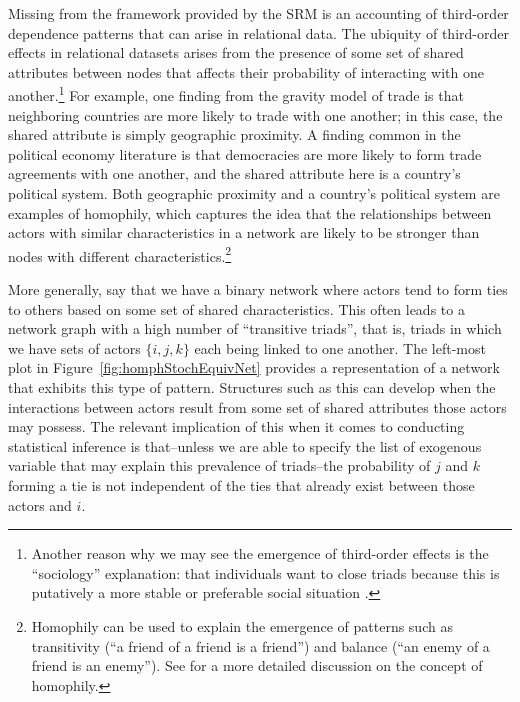\documentclass[12pt,onesided,pdflatex]{amsart}
\begin{document}
Missing from the framework provided by the SRM is an accounting of third-order dependence patterns that can arise in relational data. The ubiquity of third-order effects in relational datasets arises from the presence of some set of shared attributes between nodes that affects their probability of interacting with one another.\footnote{Another reason why we may see the emergence of third-order effects is the ``sociology'' explanation: that individuals want to close triads because  this is putatively a more stable or preferable social situation \citep{wasserman:faust:1994}.} For example, one finding from the gravity model of trade is that neighboring countries are more likely to trade with one another; in this case, the shared attribute is simply geographic proximity. A finding common in the political economy literature is that democracies are more likely to form trade agreements with one another, and the shared attribute here is a country's political system. Both geographic proximity and a country's political system are examples of homophily, which captures the idea that the relationships between actors with similar characteristics in a network are likely to be stronger than nodes with different characteristics.\footnote{Homophily can be used to explain the emergence of patterns such as transitivity (``a friend of a friend is a friend'') and balance (``an enemy of a friend is an enemy''). See \citet{shalizi:thomas:2011} for a more detailed discussion on the concept of homophily.} 

More generally, say that we have a binary network where actors tend to form ties to others based on some set of shared characteristics. This often leads to a network graph with a high number of ``transitive triads'', that is, triads in which we have sets of actors $\{i,j,k\}$ each being linked to one another. The left-most plot in Figure~\ref{fig:homphStochEquivNet} provides a representation of a network that exhibits this type of pattern. Structures such as this can develop when the interactions between actors result from some set of shared attributes those actors may possess. The relevant implication of this when it comes to conducting statistical inference is that--unless we are able to specify the list of exogenous variable that may explain this prevalence of triads--the probability of $j$ and $k$ forming a tie is not independent of the ties that already exist between those actors and $i$. 

\end{document}
